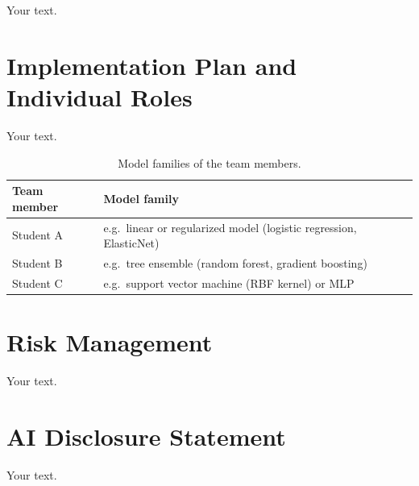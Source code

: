 \documentclass{article}
\begin{document}
Your text.

\section{Implementation Plan and Individual Roles}

Your text.

\begin{table}[h]
  \caption{Model families of the team members.}
  \label{tab:roles}
  \centering
  \begin{tabular}{ll}
    \toprule
    Team member & Model family \\
    \midrule
    Student A & e.g.\ linear or regularized model (logistic regression, ElasticNet) \\
    Student B & e.g.\ tree ensemble (random forest, gradient boosting) \\
    Student C & e.g.\ support vector machine (RBF kernel) or MLP \\
    \bottomrule
  \end{tabular}
\end{table}

\section{Risk Management}

Your text.




\appendix

\section{AI Disclosure Statement}

Your text.
\end{document}
